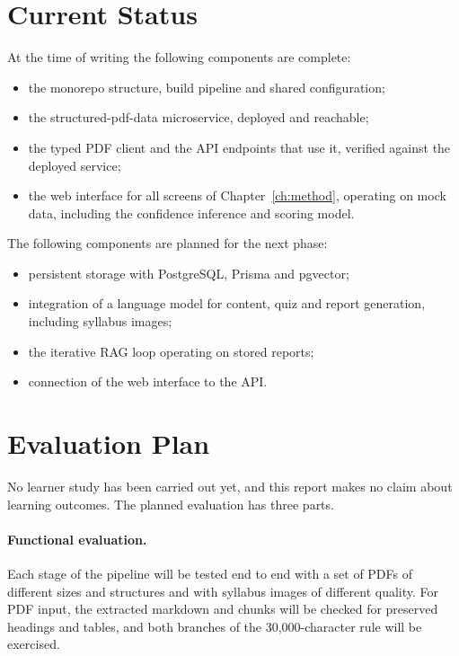 \documentclass[12pt,a4paper,oneside]{report}
\begin{document}
\section{Current Status}

At the time of writing the following components are complete:
\begin{itemize}
  \item the monorepo structure, build pipeline and shared configuration;
  \item the structured-pdf-data microservice, deployed and reachable;
  \item the typed PDF client and the API endpoints that use it, verified
        against the deployed service;
  \item the web interface for all screens of Chapter~\ref{ch:method}, operating on
        mock data, including the confidence inference and scoring model.
\end{itemize}
The following components are planned for the next phase:
\begin{itemize}
  \item persistent storage with PostgreSQL, Prisma and pgvector;
  \item integration of a language model for content, quiz and report
        generation, including syllabus images;
  \item the iterative RAG loop operating on stored reports;
  \item connection of the web interface to the API.
\end{itemize}

\section{Evaluation Plan}\label{sec:evalplan}

No learner study has been carried out yet, and this report makes no claim
about learning outcomes. The planned evaluation has three parts.

\paragraph{Functional evaluation.} Each stage of the pipeline will be
tested end to end with a set of PDFs of different sizes and structures and
with syllabus images of different quality. For PDF input, the extracted
markdown and chunks will be checked for preserved headings and tables, and
both branches of the 30,000-character rule will be exercised.
\end{document}
